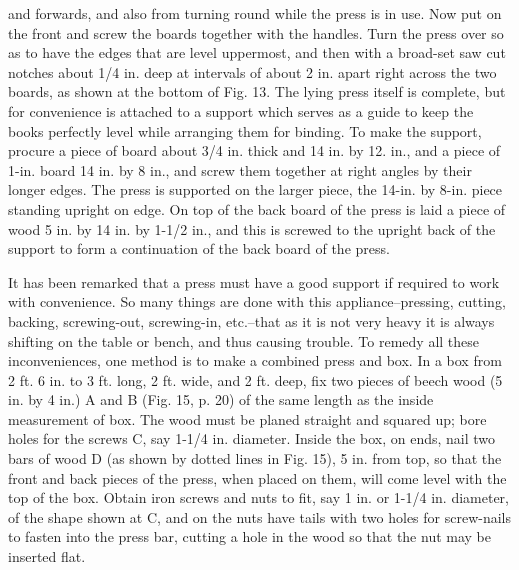 \documentclass[twoside]{book}
\begin{document}
	\vspace*{\fill}
\pagebreak
and forwards, and also from turning round while
the press is in use. Now put on the front and screw
the boards together with the handles. Turn the
press over so as to have the edges that are level
uppermost, and then with a broad-set saw cut
notches about 1/4 in. deep at intervals of about 2 in.
apart right across the two boards, as shown at the
bottom of Fig. 13. The lying press itself is complete,
but for convenience is attached to a support
which serves as a guide to keep the books perfectly
level while arranging them for binding. To make
the support, procure a piece of board about 3/4 in.
thick and 14 in. by 12. in., and a piece of 1-in. board
14 in. by 8 in., and screw them together at right
angles by their longer edges. The press is supported
on the larger piece, the 14-in. by 8-in. piece
standing upright on edge. On top of the back board
of the press is laid a piece of wood 5 in. by 14 in.
by 1-1/2 in., and this is screwed to the upright back
of the support to form a continuation of the back
board of the press.

It has been remarked that a press must have a
good support if required to work with convenience.
So many things are done with this appliance--pressing,
cutting, backing, screwing-out, screwing-in,
etc.--that as it is not very heavy it is always
shifting on the table or bench, and thus causing trouble.
To remedy all these inconveniences, one method is
to make a combined press and box. In a box from
2 ft. 6 in. to 3 ft. long, 2 ft. wide, and 2 ft. deep,
fix two pieces of beech wood (5 in. by 4 in.) A and B
(Fig. 15, p. 20) of the same length as the inside
measurement of box. The wood must be planed straight
and squared up; bore holes for the screws C, say
1-1/4 in. diameter. Inside the box, on ends, nail two
bars of wood D (as shown by dotted lines in Fig.
15), 5 in. from top, so that the front and back
pieces of the press, when placed on them, will come
level with the top of the box. Obtain iron screws
\pagebreak
and nuts to fit, say 1 in. or 1-1/4 in. diameter, of the
shape shown at C, and on the nuts have tails with
two holes for screw-nails to fasten into the press
bar, cutting a hole in the wood so that the nut may
be inserted flat.
\end{document}
